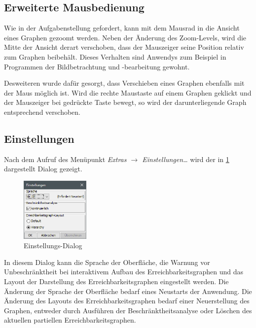 \subsection{Erweiterte Mausbedienung}
Wie in der Aufgabenstellung gefordert, kann mit dem Mausrad in die Ansicht eines
Graphen gezoomt werden. Neben der Änderung des Zoom-Levels, wird die Mitte der
Ansicht derart verschoben, dass der Mauszeiger seine Position relativ zum
Graphen beibehält. Dieses Verhalten sind Anwendys zum Beispiel in Programmen der
Bildbetrachtung und -bearbeitung gewohnt.

Desweiteren wurde dafür gesorgt, dass Verschieben eines Graphen ebenfalls mit
der Maus möglich ist. Wird die rechte Maustaste auf einem Graphen geklickt und
der Mauszeiger bei gedrückte Taste bewegt, so wird der darunterliegende Graph
entsprechend verschoben.

\subsection{Einstellungen}
\label{sec:settings}
Nach dem Aufruf des Menüpunkt \emph{Extras $\rightarrow$ Einstellungen\ldots}
wird der in \cref{img:settings} dargestellt Dialog gezeigt.

\begin{figure}[H]
  \centering
  \includegraphics[width=0.3\textwidth]{../img/settings.png}
  \caption{Einstellungs-Dialog}
  \label{img:settings}
\end{figure}

In diesem Dialog kann die Sprache der Oberfläche, die Warnung vor
Unbeschränktheit bei interaktivem Aufbau des Erreichbarkeitsgraphen und das
Layout der Darstellung des Erreichbarkeitsgraphen eingestellt werden. Die
Änderung der Sprache der Oberfläche bedarf eines Neustarts der Anwendung. Die
Änderung des Layouts des Erreichbarkeitsgraphen bedarf einer Neuerstellung des
Graphen, entweder durch Ausführen der Beschränktheitsanalyse oder Löschen des
aktuellen partiellen Erreichbarkeitsgraphen.
